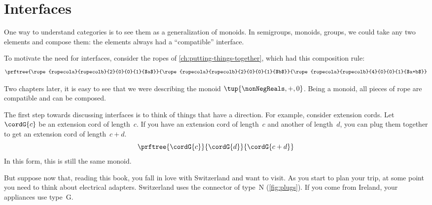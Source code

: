 

\section{Interfaces}\label{sec:interfaces}

One way to understand categories is to see them as a generalization of monoids.
In semigroups, monoids, groups, we could take any two elements and compose them: the elements always had a ``compatible'' interface.

To motivate the need for interfaces, consider the ropes of \cref{ch:putting-things-together},
which had this composition rule:
%
\begin{equation*}
    \prftree{\rope{ropecola}{ropecolb}{2}{0}{0}{1}{$a$}}
    {\rope{ropecola}{ropecolb}{2}{0}{0}{1}{$b$}}
    {\rope{ropecola}{ropecolb}{4}{0}{0}{1}{$a+b$}}
\end{equation*}

Two chapters later, it is easy to see that we were describing the monoid $\tup{\nonNegReals, +, 0}$.
Being a monoid, all pieces of rope are compatible and can be composed.

The first step towards discussing interfaces is to think of things that have a direction.
For example, consider extension cords.
Let~$\cordG{c}$ be an extension cord of length~$c$.
If you have an extension cord of length~$c$ and another of length~$d$, you can plug them together to get an extension cord of length~$c+d$.
%
\begin{equation}
    \label{eq:cords}
    \prftree{\cordG{c}}{\cordG{d}}{\cordG{c+d}}
\end{equation}
%
In this form, this is still the same monoid.

But suppose now that, reading this book, you fall in love with Switzerland and want to visit.
As you start to plan your trip, at some point you need to think about electrical adapters.
Switzerland uses the connector of type~N (\cref{fig:plugs}).
If you come from Ireland, your appliances use type~G.

